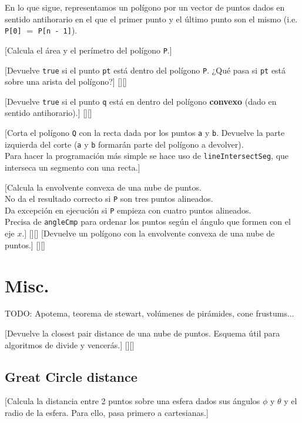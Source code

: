 	En lo que sigue, representamos un polígono por un vector de puntos dados en sentido antihorario en el que el primer punto y el último punto son el mismo (i.e. \texttt{P[0]} $=$ \texttt{P[n - 1]}).
	
		[Calcula el área y el perímetro del polígono \texttt{P}.]
	
		[Devuelve \texttt{true} si el punto \texttt{pt} está dentro del polígono \texttt{P}. ¿Qué pasa si \texttt{pt} está sobre una arista del polígono?]%
		[][]
		
		[Devuelve \texttt{true} si el punto \texttt{q} está en dentro del polígono \textbf{convexo} (dado en sentido antihorario).]%
		[][]

		[Corta el polígono \texttt{Q} con la recta dada por los puntos \texttt{a} y \texttt{b}. Devuelve la parte izquierda del corte (\texttt{a} y \texttt{b} formarán parte del polígono a devolver).\\
		Para hacer la programación más simple se hace uso de \texttt{lineIntersectSeg}, que interseca un segmento con una recta.]%
	
		[Calcula la envolvente convexa de una nube de puntos.\\
		 No da el resultado correcto si \texttt{P} son tres puntos alineados.\\
		 Da excepción en ejecución si \texttt{P} empieza con cuatro puntos alineados.\\
		 Precisa de \texttt{angleCmp} para ordenar los puntos según el ángulo que formen con el eje $x$.]%
		 [][]	
		[Devuelve un polígono con la envolvente convexa de una nube de puntos.]%
		[][]

\section{Misc.}

TODO: Apotema, teorema de stewart, volúmenes de pirámides, cone frustums...

%
	[Devuelve la closest pair distance de una nube de puntos. Esquema útil para algoritmos de divide y vencerás.]%
	[][]

\subsection{Great Circle distance}

		[Calcula la distancia entre 2 puntos sobre una esfera dados sus ángulos $\phi$ y $\theta$ y el radio de la esfera. Para ello, pasa primero a cartesianas.]